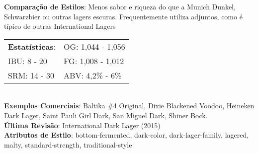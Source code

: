 \textbf{Comparação de Estilos}: Menos sabor e riqueza do que a Munich Dunkel, Schwarzbier ou outras lagers escuras. Frequentemente utiliza adjuntos, como é típico de outras International Lagers \\
\begin{tabular}{@{}p{35mm}p{35mm}@{}}
  \textbf{Estatísticas}: & OG: 1,044 - 1,056 \\
  IBU: 8 - 20 & FG: 1,008 - 1,012 \\
  SRM: 14 - 30 & ABV: 4,2\% - 6\%
  \end{tabular}\\
\textbf{Exemplos Comerciais}: Baltika \#4 Original, Dixie Blackened Voodoo, Heineken Dark Lager, Saint Pauli Girl Dark, San Miguel Dark, Shiner Bock. \\
\textbf{Última Revisão}: International Dark Lager (2015) \\
\textbf{Atributos de Estilo}: bottom-fermented, dark-color, dark-lager-family, lagered, malty, standard-strength, traditional-style